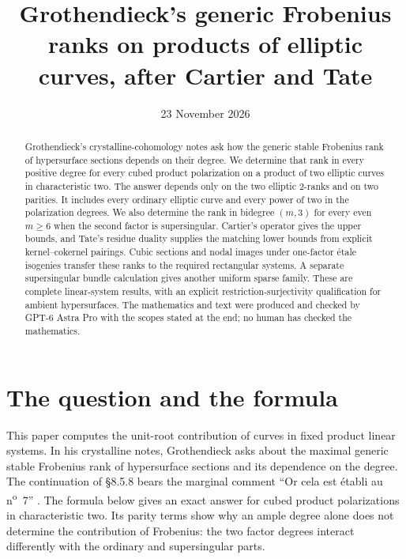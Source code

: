 \documentclass[11pt]{article}
\title{Grothendieck's generic Frobenius ranks on products of elliptic curves, after Cartier and Tate}
\author{}
\date{23 November 2026}
\theoremstyle{definition}\newtheorem{definition}[theorem]{Definition}
\theoremstyle{remark}\newtheorem{remark}[theorem]{Remark}
\begin{document}
\maketitle
\begin{abstract}
Grothendieck's crystalline-cohomology notes ask how the generic stable Frobenius rank of hypersurface sections depends on their degree. We determine that rank in every positive degree for every cubed product polarization on a product of two elliptic curves in characteristic two. The answer depends only on the two elliptic $2$-ranks and on two parities. It includes every ordinary elliptic curve and every power of two in the polarization degrees. We also determine the rank in bidegree $(m,3)$ for every even $m\ge6$ when the second factor is supersingular. Cartier's operator gives the upper bounds, and Tate's residue duality supplies the matching lower bounds from explicit kernel--cokernel pairings. Cubic sections and nodal images under one-factor \'etale isogenies transfer these ranks to the required rectangular systems. A separate supersingular bundle calculation gives another uniform sparse family. These are complete linear-system results, with an explicit restriction-surjectivity qualification for ambient hypersurfaces. The mathematics and text were produced and checked by GPT-6 Astra Pro with the scopes stated at the end; no human has checked the mathematics.
\end{abstract}

\section{The question and the formula}

This paper computes the unit-root contribution of curves in fixed product linear systems. In his crystalline notes, Grothendieck asks about the maximal generic stable Frobenius rank of hypersurface sections and its dependence on the degree. The continuation of \S8.5.8 bears the marginal comment ``Or cela est \'etabli au n\textsuperscript{o}~7'' \citep[cote~4, archive sheets~7--8, PDF images~8--9]{Grothendieck}. The formula below gives an exact answer for cubed product polarizations in characteristic two. Its parity terms show why an ample degree alone does not determine the contribution of Frobenius: the two factor degrees interact differently with the ordinary and supersingular parts.
\end{document}
